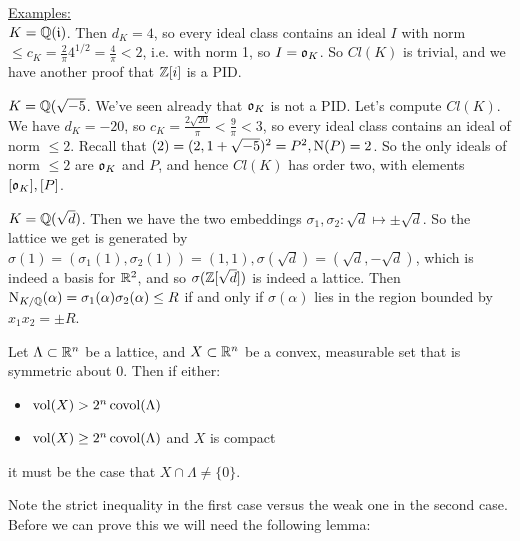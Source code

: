 \documentclass[10pt,a4paper]{article}
\begin{document}
\hspace*{-1em}\underline{Examples:}\\
$K = \mathbb{Q}(\mathfrak{i})$. Then $d_K = 4$, so every ideal class contains an ideal $I$ with norm $\leq c_K = \frac{2}{\pi}4^{1/2} = \frac{4}{\pi} < 2$, i.e. with norm 1, so $I = \mathfrak{o}_K$. So $Cl(K)$ is trivial, and we have another proof that $\mathbb{Z}[i]$ is a PID.

$K = \mathbb{Q}(\sqrt{-5}$. We've seen already that $\mathfrak{o}_K$ is not a PID. Let's compute $Cl(K)$. We have $d_K = -20$, so $c_K = \frac{2\sqrt{20}}{\pi} < \frac{9}{\pi} < 3$, so every ideal class contains an ideal of norm $\leq 2$. Recall that $(2) = (2, 1+\sqrt{-5})^2 = P^2, \operatorname{N}(P) = 2$. So the only ideals of norm $\leq 2$ are $\mathfrak{o}_K$ and $P$, and hence $Cl(K)$ has order two, with elements $[\mathfrak{o}_K], [P]$. 

$K = \mathbb{Q}(\sqrt{d})$. Then we have the two embeddings $\sigma_1,\sigma_2: \sqrt{d} \mapsto \pm \sqrt{d}$. So the lattice we get is generated by $\sigma(1) = (\sigma_1(1), \sigma_2(1)) = (1,1), \sigma(\sqrt{d}) = (\sqrt{d}, -\sqrt{d})$, which is indeed a basis for $\mathbb{R}^2$, and so $\sigma(\mathbb{Z}[\sqrt{d}])$ is indeed a lattice. Then $\operatorname{N}_{K/\mathbb{Q}}(\alpha) = \sigma_1(\alpha)\sigma_2(\alpha) \leq R$ if and only if $\sigma(\alpha)$ lies in the region bounded by $x_1x_2 = \pm R$.
\begin{figure}[H]
\centering
{}
\end{figure}
\begin{theorem}
Let $\Lambda \subset \mathbb{R}^n$ be a lattice, and $X \subset \mathbb{R}^n$ be a convex, measurable set that is symmetric about 0. Then if either:
\begin{itemize}
\item $\operatorname{vol}(X) > 2^n\operatorname{covol}(\Lambda)$
\item $\operatorname{vol}(X) \geq 2^n\operatorname{covol}(\Lambda)$ and $X$ is compact
\end{itemize}it must be the case that $X \cap \Lambda \neq\{0\}$.
\end{theorem}
Note the strict inequality in the first case versus the weak one in the second case. Before we can prove this we will need the following lemma:
\end{document}
